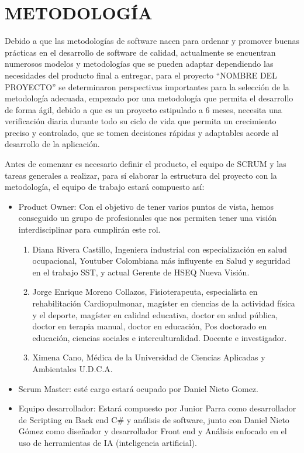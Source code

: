 \chapter{METODOLOGÍA}
Debido a que las metodologías de software nacen para ordenar y promover buenas prácticas en el desarrollo de software de calidad, actualmente se encuentran numerosos modelos y metodologías que se pueden adaptar dependiendo las necesidades del producto final a entregar,\parencite{Nohemy2015ESCOGERDECISION} para el proyecto “NOMBRE DEL PROYECTO” se determinaron perspectivas importantes para la selección de la metodología adecuada, empezado por una metodología que permita el desarrollo de forma ágil, debido a que es un proyecto estipulado a 6 meses, necesita una verificación diaria durante todo su ciclo de vida que permita un crecimiento preciso y controlado, que se tomen decisiones rápidas y adaptables acorde al desarrollo de la aplicación. 


Antes de comenzar es necesario definir el producto, el equipo de SCRUM y las tareas generales a realizar, para sí elaborar la estructura del proyecto con la metodología, el equipo de trabajo estará compuesto así: 
\begin{itemize}
    \item Product Owner:  Con el objetivo de tener varios puntos de vista, hemos conseguido un grupo de profesionales que nos permiten tener una visión interdisciplinar para cumplirán este rol.
    \begin{enumerate}
        \item Diana Rivera Castillo, Ingeniera industrial con especialización en salud ocupacional, Youtuber Colombiana más influyente en Salud y seguridad en el trabajo SST, y actual Gerente de HSEQ Nueva Visión.
        \item Jorge Enrique Moreno Collazos, Fisioterapeuta, especialista en rehabilitación Cardiopulmonar, magíster en ciencias de la actividad física y el deporte, magíster en calidad educativa, doctor en salud pública, doctor en terapia manual, doctor en educación, Pos doctorado en educación, ciencias sociales e interculturalidad. Docente e investigador.
        \item Ximena Cano, Médica de la Universidad de Ciencias Aplicadas y Ambientales U.D.C.A. 
    \end{enumerate}

\item Scrum Master: esté cargo estará ocupado por Daniel Nieto Gomez.
\item Equipo desarrollador: Estará compuesto por Junior Parra como desarrollador de Scripting en Back end C\# y análisis de software, junto con Daniel Nieto Gómez como diseñador y desarrollador Front end y Análisis enfocado en el uso de herramientas de IA (inteligencia artificial). 
\end{itemize}


